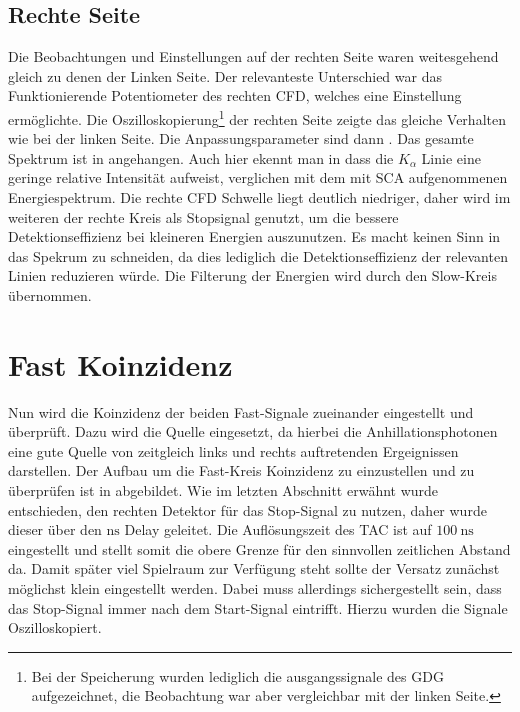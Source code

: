 \subsection*{Rechte Seite}
Die Beobachtungen und Einstellungen auf der rechten Seite waren weitesgehend gleich zu denen der Linken Seite. Der relevanteste Unterschied war das Funktionierende Potentiometer des rechten CFD, welches eine Einstellung ermöglichte. Die Oszilloskopierung\footnote{Bei der Speicherung wurden lediglich die ausgangssignale des GDG aufgezeichnet, die Beobachtung war aber vergleichbar mit der linken Seite.} der rechten Seite zeigte das gleiche Verhalten wie bei der linken Seite.
Die Anpassungsparameter sind dann . Das gesamte \na Spektrum ist in  angehangen.
Auch hier ekennt man in  dass die $K_\alpha$ Linie eine geringe relative Intensität aufweist, verglichen mit dem mit SCA aufgenommenen Energiespektrum.
Die rechte CFD Schwelle liegt deutlich niedriger, daher wird im weiteren der rechte Kreis als Stopsignal genutzt, um die bessere Detektionseffizienz bei kleineren Energien auszunutzen. Es macht keinen Sinn in das Spekrum zu schneiden, da dies lediglich die Detektionseffizienz der relevanten Linien reduzieren würde. Die Filterung der Energien wird durch den Slow-Kreis übernommen.



\section{Fast Koinzidenz}
Nun wird die Koinzidenz der beiden Fast-Signale zueinander eingestellt und überprüft. Dazu wird die \na Quelle eingesetzt, da hierbei die Anhillationsphotonen eine gute Quelle von zeitgleich links und rechts auftretenden Ergeignissen darstellen.
Der Aufbau um die Fast-Kreis Koinzidenz zu einzustellen und zu überprüfen ist in  abgebildet.
Wie im letzten Abschnitt erwähnt wurde entschieden, den rechten Detektor für das Stop-Signal zu nutzen, daher wurde dieser über den $\unit{\nano\second}$ Delay geleitet. Die Auflösungszeit des TAC ist auf $\SI{100}{\nano\second}$ eingestellt und stellt somit die obere Grenze für den sinnvollen zeitlichen Abstand da. Damit später viel Spielraum zur Verfügung steht sollte der Versatz zunächst möglichst klein eingestellt werden. Dabei muss allerdings sichergestellt sein, dass das Stop-Signal immer nach dem Start-Signal eintrifft. Hierzu wurden die Signale Oszilloskopiert.


